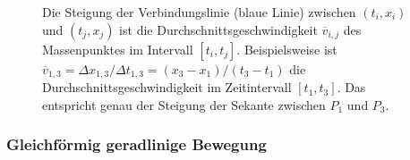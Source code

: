 \begin{figure}[htbp]
    \caption[Die Steigung der Sekante zwischen zwei Punkten entspricht der Durchschnittsgeschwindigkeit in diesem Intervall.]{Die Steigung der Verbindungslinie (blaue Linie) zwischen $(t_i, x_i)$ und $(t_j, x_j)$ ist die Durchschnittsgeschwindigkeit $\overline{v}_{i,j}$ des Massenpunktes im Intervall $[t_i, t_j]$. Beispielsweise ist $\overline{v}_{1,3} = \Delta x_{1,3}/\Delta t_{1,3} = (x_3-x_1)/(t_3-t_1)$ die Durchschnittsgeschwindigkeit im Zeitintervall $[t_1, t_3]$. Das entspricht genau der Steigung der Sekante zwischen $P_1$ und $P_3$.}\label{fig: durchschnittsgeschwindigkeit_bsp}
\end{figure}


\subsubsection{Gleichförmig geradlinige Bewegung}\label{subsubsec: geschw_bei_gleichf_geradliniger_Bewegung}

